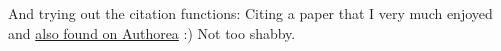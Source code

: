 And trying out the citation functions: \cite{2014PLSCB..10E3542G} Citing a paper that I very much enjoyed and \href{https://www.authorea.com/users/3/articles/3410/_show_article}{also found on Authorea} :) Not too shabby.


    
    
    
    
